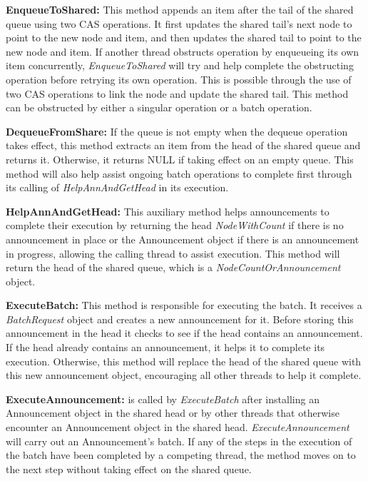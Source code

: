\textbf{EnqueueToShared: } This method appends an item after the tail of the shared queue using two CAS operations. It first updates the shared tail’s next node to point to the new node and item, and then updates the shared tail to point to the new node and item. If another thread obstructs operation by enqueueing its own item concurrently, \textit{EnqueueToShared} will try and help complete the obstructing operation before retrying its own operation. This is possible through the use of two CAS operations to link the node and update the shared tail. This method can be obstructed by either a singular operation or a batch operation.\newline

\textbf{DequeueFromShare: } If the queue is not empty when the dequeue operation takes effect, this method extracts an item from the head of the shared queue and returns it. Otherwise, it returns NULL if taking effect on an empty queue. This method will also help assist ongoing batch operations to complete first through its calling of \textit{HelpAnnAndGetHead} in its execution.\newline

\textbf{HelpAnnAndGetHead: } This auxiliary method helps announcements to complete their execution by returning the head \textit{NodeWithCount} if there is no announcement in place or the Announcement object if there is an announcement in progress, allowing the calling thread to assist execution. This method will return the head of the shared queue, which is a \textit{NodeCountOrAnnouncement} object.\newline

\textbf{ExecuteBatch: } This method is responsible for executing the batch. It receives a \textit{BatchRequest} object and creates a new announcement for it. Before storing this announcement in the head it checks to see if the head contains an announcement. If the head already contains an announcement, it helps it to complete its execution. Otherwise, this method will replace the head of the shared queue with this new announcement object, encouraging all other threads to help it complete.\newline

\textbf{ExecuteAnnouncement: } is called by \textit{ExecuteBatch} after installing an Announcement object in the shared head or by other threads that otherwise encounter an Announcement object in the shared head. \textit{ExecuteAnnouncement} will carry out an Announcement’s batch. If any of the steps in the execution of the batch have been completed by a competing thread, the method moves on to the next step without taking effect on the shared queue.\newline

